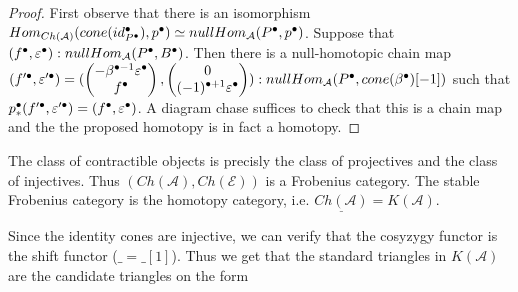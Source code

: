 \begin{proof}
        First observe that there is an isomorphism $Hom_{Ch(\mathcal{A})}(cone(id_{P^{\bullet}}^{\bullet}),p^{\bullet})\simeq nullHom_{\mathcal{A}}(P^{\bullet},p^{\bullet})$. Suppose that $(f^{\bullet},\varepsilon^{\bullet}):nullHom_{\mathcal{A}}(P^{\bullet},B^{\bullet})$. Then there is a null-homotopic chain map $(f'^{\bullet},\varepsilon '^{\bullet})=(\begin{pmatrix} -\beta^{\bullet - 1}\varepsilon^{\bullet} \\ f^{\bullet} \end{pmatrix}, \begin{pmatrix} 0 \\ (-1)^{\bullet + 1}\varepsilon^{\bullet} \end{pmatrix}):nullHom_{\mathcal{A}}(P^{\bullet},cone(\beta^{\bullet})[-1])$ such that \\$p^{\bullet}_*(f'^{\bullet},\varepsilon '^{\bullet})=(f^{\bullet},\varepsilon^{\bullet})$. A diagram chase suffices to check that this is a chain map and the the proposed homotopy is in fact a homotopy.
    \end{proof}

    \begin{corollary}
        The class of contractible objects is precisly the class of projectives and the class of injectives. Thus $(Ch(\mathcal{A}),Ch(\mathcal{E}))$ is a Frobenius category. The stable Frobenius category is the homotopy category, i.e. $\underline{Ch(\mathcal{A})}=K(\mathcal{A})$. 
    \end{corollary}

    Since the identity cones are injective, we can verify that the cosyzygy functor is the shift functor (\upside{$\Omega$}$\_=\_[1]$). Thus we get that the standard triangles in $K(\mathcal{A})$ are the candidate triangles on the form
    \begin{center}
    \end{center}

